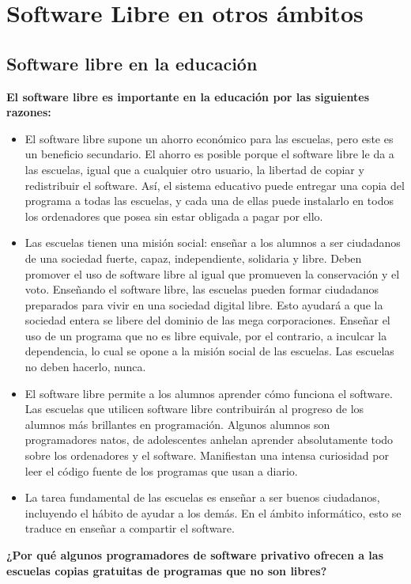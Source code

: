 \chapter{Software Libre en otros ámbitos}

\section{Software libre en la educación}

{\bf El software libre es importante en la educación por las siguientes razones:}
\begin{itemize}
\item El software libre supone un ahorro económico para las escuelas, pero este es un beneficio secundario. El ahorro es posible porque el software libre le da a las escuelas, igual que a cualquier otro usuario, la libertad de copiar y redistribuir el software. Así, el sistema educativo puede entregar una copia del programa a todas las escuelas, y cada una de ellas puede instalarlo en todos los ordenadores que posea sin estar obligada a pagar por ello.
\item Las escuelas tienen una misión social: enseñar a los alumnos a ser ciudadanos de una sociedad fuerte, capaz, independiente, solidaria y libre. Deben promover el uso de software libre al igual que promueven la conservación y el voto. Enseñando el software libre, las escuelas pueden formar ciudadanos preparados para vivir en una sociedad digital libre. Esto ayudará a que la sociedad entera se libere del dominio de las mega corporaciones. Enseñar el uso de un programa que no es libre equivale, por el contrario, a inculcar la dependencia, lo cual se opone a la misión social de las escuelas. Las escuelas no deben hacerlo, nunca.
\item El software libre permite a los alumnos aprender cómo funciona el software. Las escuelas que utilicen software libre contribuirán al progreso de los alumnos más brillantes en programación. Algunos alumnos son programadores natos, de adolescentes anhelan aprender absolutamente todo sobre los ordenadores y el software. Manifiestan una intensa curiosidad por leer el código fuente de los programas que usan a diario.
\item La tarea fundamental de las escuelas es enseñar a ser buenos ciudadanos, incluyendo el hábito de ayudar a los demás. En el ámbito informático, esto se traduce en enseñar a compartir el software.
\end{itemize}


{\bf ¿Por qué algunos programadores de software privativo ofrecen a las escuelas copias gratuitas de programas que no son libres?}

